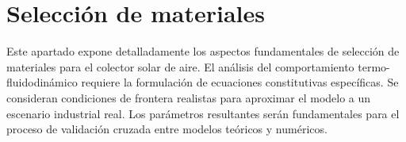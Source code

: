 \section{Selección de materiales}
\label{sec:cap05_materiales}

Este apartado expone detalladamente los aspectos fundamentales de selección de materiales para el colector solar de aire.
El análisis del comportamiento termo-fluidodinámico requiere la formulación de ecuaciones constitutivas específicas.
Se consideran condiciones de frontera realistas para aproximar el modelo a un escenario industrial real.
Los parámetros resultantes serán fundamentales para el proceso de validación cruzada entre modelos teóricos y numéricos.
